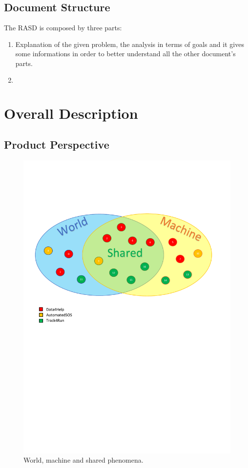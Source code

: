 \documentclass[a4paper]{article}
\begin{document}
    \subsection{Document Structure}
    The RASD is composed by three parts:
    \begin{enumerate}
        \item Explanation of the given problem, the analysis in terms of goals and it gives some informations in order to better understand all the other document's parts.
        \item 
    \end{enumerate}
    
    \section{Overall Description}
    
    \subsection{Product Perspective}
    
    \begin{figure}[h!]
        \centering
        \includegraphics[width=\linewidth]{worldMachineShared-small}
        \caption{World, machine and shared phenomena.}
        \label{fig:my_label}
    \end{figure}
    
\end{document}
